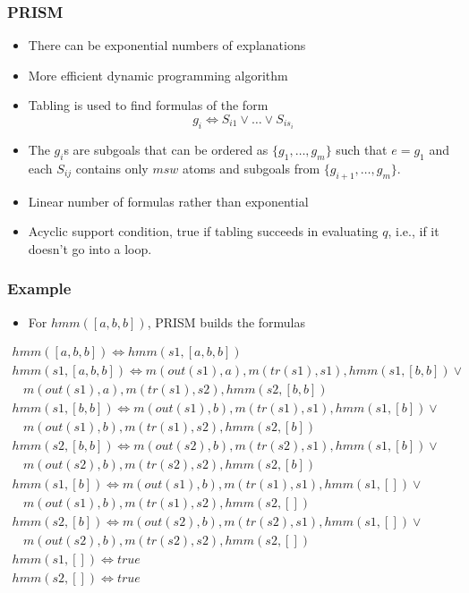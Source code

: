 \documentclass[trans,aspectratio=1610]{beamer}
\begin{document}
\begin{frame}
  \frametitle{PRISM}
  \begin{itemize}
\item There can be  exponential numbers of explanations
\item More efficient dynamic programming algorithm
\item
Tabling is used to find formulas of the form
$$g_{i}\Leftrightarrow S_{i1}\vee\ldots\vee S_{is_i}$$
\item The $g_i$s are  subgoals  that can be ordered as
$\{g_1,\ldots,g_m\}$ such that $e=g_1$ and
 each $S_{ij}$ contains only $msw$ atoms and subgoals from $\{g_{i+1},\ldots,g_{m}\}$.
\item
Linear number of  formulas  rather than exponential
\item  \alert{Acyclic support condition}, true if tabling succeeds in 
evaluating $q$, i.e., if it doesn't go into a loop.
\end{itemize}
\end{frame}

\begin{frame}
  \frametitle{Example}
  \begin{itemize}
\item For
$hmm([a,b,b])$, PRISM builds
the formulas 
\end{itemize}
\begin{scriptsize}
$\begin{array}{l}
hmm([a,b,b])\Leftrightarrow hmm(s1,[a,b,b])\\
hmm(s1,[a,b,b]) \Leftrightarrow m(out(s1),a),m(tr(s1),s1),hmm(s1,[b,b])\vee\\
\ \ \ \ m(out(s1),a),m(tr(s1),s2),hmm(s2,[b,b])\\
hmm(s1,[b,b]) \Leftrightarrow m(out(s1),b),m(tr(s1),s1),hmm(s1,[b])
\vee\\
\ \ \ \ m(out(s1),b),m(tr(s1),s2),hmm(s2,[b])\\
hmm(s2,[b,b]) \Leftrightarrow m(out(s2),b),m(tr(s2),s1),hmm(s1,[b])
\vee\\
\ \ \ \ m(out(s2),b),m(tr(s2),s2),hmm(s2,[b])\\
hmm(s1,[b]) \Leftrightarrow m(out(s1),b),m(tr(s1),s1),hmm(s1,[])\vee\\
\ \ \ \  m(out(s1),b),m(tr(s1),s2),hmm(s2,[])\\
hmm(s2,[b]) \Leftrightarrow m(out(s2),b),m(tr(s2),s1),hmm(s1,[])\vee\\
\ \ \ \  m(out(s2),b),m(tr(s2),s2),hmm(s2,[])\\
hmm(s1,[]) \Leftrightarrow true\\
hmm(s2,[]) \Leftrightarrow true
\end{array}$
\end{scriptsize}
\end{frame}
\end{document}
